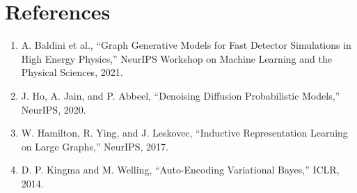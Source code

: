 \documentclass[11pt]{article}
\begin{document}
\section*{References}
\small
\begin{enumerate}
    \item A. Baldini et al., ``Graph Generative Models for Fast Detector Simulations in High Energy Physics,'' NeurIPS Workshop on Machine Learning and the Physical Sciences, 2021.
    \item J. Ho, A. Jain, and P. Abbeel, ``Denoising Diffusion Probabilistic Models,'' NeurIPS, 2020.
    \item W. Hamilton, R. Ying, and J. Leskovec, ``Inductive Representation Learning on Large Graphs,'' NeurIPS, 2017.
    \item D. P. Kingma and M. Welling, ``Auto-Encoding Variational Bayes,'' ICLR, 2014.
\end{enumerate}
\end{document}
